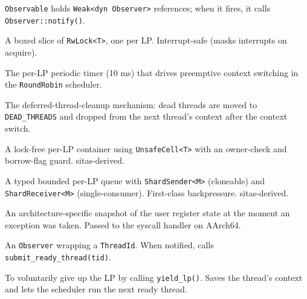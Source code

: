 \begin{description}
        \texttt{Observable} holds \texttt{Weak<dyn Observer>} references;
        when it fires, it calls \texttt{Observer::notify()}.
    \item[PerLp<T>] A boxed slice of \texttt{RwLock<T>}, one per LP.
        Interrupt-safe (masks interrupts on acquire).
    \item[Quantum timer] The per-LP periodic timer (10 ms) that drives
        preemptive context switching in the \texttt{RoundRobin} scheduler.
    \item[Reaper] The deferred-thread-cleanup mechanism: dead threads are
        moved to \texttt{DEAD\_THREADS} and dropped from the next thread's
        context after the context switch.
    \item[ShardLocal<T>] A lock-free per-LP container using
        \texttt{UnsafeCell<T>} with an owner-check and borrow-flag guard.
        sitas-derived.
    \item[ShardMailbox<M>] A typed bounded per-LP queue with
        \texttt{ShardSender<M>} (cloneable) and \\ \texttt{ShardReceiver<M>}
        (single-consumer). First-class backpressure. sitas-derived.
    \item[TrapFrame] An architecture-specific snapshot of the user register
        state at the moment an exception was taken. Passed to the syscall
        handler on AArch64.
    \item[Waker] An \texttt{Observer} wrapping a \texttt{ThreadId}. When
        notified, calls \texttt{submit\_ready\_thread(tid)}.
    \item[Yield] To voluntarily give up the LP by calling
        \texttt{yield\_lp()}. Saves the thread's context and lets the scheduler
        run the next ready thread.
\end{description}

\endinput
